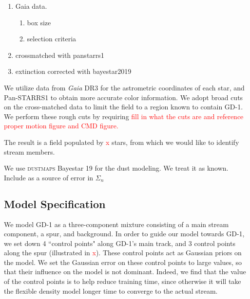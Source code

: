 \documentclass[twocolumn]{aastex631}
\newcommand{\package}[1]{\textsc{#1}}
\newcommand{\TODO}[1]{{\textcolor{red}{#1}}}
\newcommand{\JN}[1]{\TODO{#1}}
\begin{document}
        \begin{enumerate}
            \item Gaia data.
                \begin{enumerate}
                    \item box size
                    \item selection criteria
                \end{enumerate}
            \item crossmatched with panstarrs1
            \item extinction corrected with bayestar2019
        \end{enumerate}

        We utilize data from {\it Gaia} DR3 for the astrometric coordinates of
        each star, and Pan-STARRS1 to obtain more accurate color information. We
        adopt broad cuts on the cross-matched data to limit the field to a
        region known to contain GD-1. We perform these rough cuts by requiring
        \JN{fill in what the cuts are and reference proper motion figure and CMD
        figure.} 

        The result is a field populated by \JN{x} stars, from which we would
        like to identify stream members.

            We use \package{dustmaps} Bayestar 19 for the dust modeling. We treat it as known. Include as a source of error in $\Sigma_n$

    \subsection{Model Specification}\label{sec:GD_1_ModelSpecification}
    
        We model GD-1 as a three-component mixture consisting of a main stream
        component, a spur, and background. In order to guide our model towards
        GD-1, we set down 4 ``control points" along GD-1's main track, and 3
        control points along the spur (illustrated in \JN{x}). These control
        points act as Gaussian priors on the model. We set the Gaussian error on
        these control points to large values, so that their influence on the
        model is not dominant. Indeed, we find that the value of the control
        points is to help reduce training time, since otherwise it will take the
        flexible density model longer time to converge to the actual stream.
\end{document}
